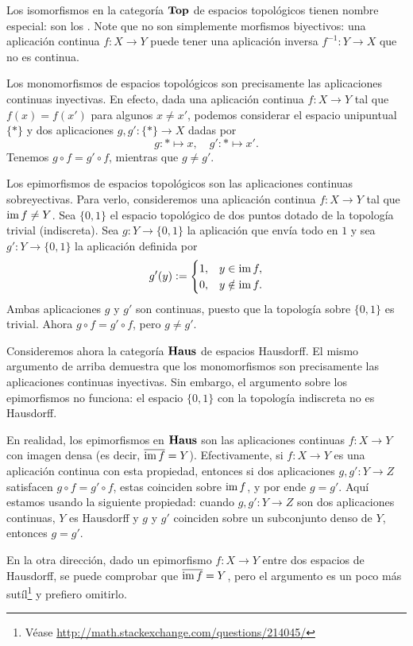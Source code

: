 \documentclass{article}
\numberwithin{equation}{section}
\theoremstyle{definition}
\begin{document}
\begin{ejemplo}
  Los isomorfismos en la categoría $\text{\bf Top}$ de espacios topológicos tienen
  nombre especial: son los . Note que no son simplemente
  morfismos biyectivos: una aplicación continua $f\colon X\to Y$ puede tener una
  aplicación inversa $f^{-1}\colon Y\to X$ que no es continua.

  Los monomorfismos de espacios topológicos son precisamente las aplicaciones
  continuas inyectivas. En efecto, dada una aplicación continua $f\colon X\to Y$
  tal que $f (x) = f (x')$ para algunos $x\ne x'$, podemos considerar el espacio
  unipuntual $\{ \ast \}$ y dos aplicaciones $g,g '\colon \{ \ast \}\to X$ dadas
  por
  $$g\colon \ast \mapsto x, \quad g'\colon \ast \mapsto x'.$$
  Tenemos $g\circ f = g'\circ f$, mientras que $g\ne g'$.

  Los epimorfismos de espacios topológicos son las aplicaciones continuas
  sobreyectivas. Para verlo, consideremos una aplicación continua
  $f\colon X\to Y$ tal que $\operatorname{im} f\ne Y$. Sea $\{ 0,1 \}$ el espacio topológico
  de dos puntos dotado de la topología trivial (indiscreta). Sea
  $g\colon Y\to \{ 0, 1 \}$ la aplicación que envía todo en $1$ y sea
  $g'\colon Y\to \{ 0, 1 \}$ la aplicación definida por
  \[ g' (y) \mathrel{\mathop:}= \begin{cases}
      1, & y\in \operatorname{im} f,\\
      0, & y\notin \operatorname{im} f.
    \end{cases} \]
  Ambas aplicaciones $g$ y $g'$ son continuas, puesto que la topología sobre
  $\{ 0, 1 \}$ es trivial. Ahora $g\circ f = g'\circ f$, pero $g\ne g'$.
\end{ejemplo}

\begin{ejemplo}
  Consideremos ahora la categoría $\text{\bf Haus}$ de espacios Hausdorff. El mismo
  argumento de arriba demuestra que los monomorfismos son precisamente las
  aplicaciones continuas inyectivas. Sin embargo, el argumento sobre los
  epimorfismos no funciona: el espacio $\{ 0, 1 \}$ con la topología indiscreta
  no es Hausdorff.

  En realidad, los epimorfismos en $\text{\bf Haus}$ son las aplicaciones continuas
  $f\colon X\to Y$ con imagen densa
  (es decir, $\overline{\operatorname{im} f} = Y$). Efectivamente, si $f\colon X\to Y$ es una
  aplicación continua con esta propiedad, entonces si dos aplicaciones
  $g,g'\colon Y\to Z$ satisfacen $g\circ f = g'\circ f$, estas coinciden sobre
  $\operatorname{im} f$, y por ende $g = g'$. Aquí estamos usando la siguiente propiedad:
  cuando $g,g'\colon Y\to Z$ son dos aplicaciones continuas, $Y$ es Hausdorff y
  $g$ y $g'$ coinciden sobre un subconjunto denso de $Y$, entonces $g = g'$.

  En la otra dirección, dado un epimorfismo $f\colon X\to Y$ entre dos espacios
  de Hausdorff, se puede comprobar que $\overline{\operatorname{im} f} = Y$, pero el argumento
  es un poco más sutíl\footnote{Véase
    \url{http://math.stackexchange.com/questions/214045/}} y prefiero omitirlo.
\end{ejemplo}
\end{document}
